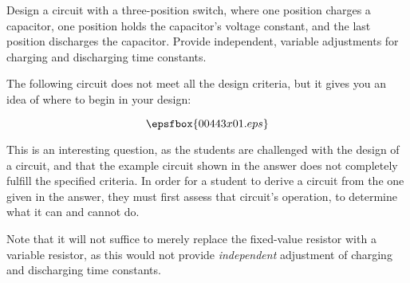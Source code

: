 

Design a circuit with a three-position switch, where one position charges a capacitor, one position holds the capacitor's voltage constant, and the last position discharges the capacitor.  Provide independent, variable adjustments for charging and discharging time constants.







The following circuit does not meet all the design criteria, but it gives you an idea of where to begin in your design:

$$\epsfbox{00443x01.eps}$$







This is an interesting question, as the students are challenged with the design of a circuit, and that the example circuit shown in the answer does not completely fulfill the specified criteria.  In order for a student to derive a circuit from the one given in the answer, they must first assess that circuit's operation, to determine what it can and cannot do.

Note that it will not suffice to merely replace the fixed-value resistor with a variable resistor, as this would not provide {\it independent} adjustment of charging and discharging time constants.




